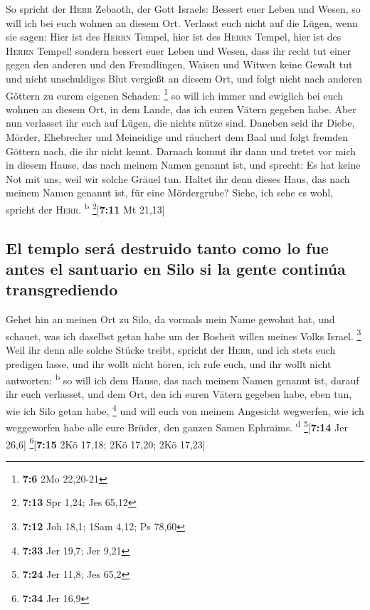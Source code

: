  So spricht der \textsc{Herr} Zebaoth, der Gott Israels:
Bessert euer Leben und Wesen, so will ich bei euch wohnen an diesem Ort.
 Verlasst euch nicht auf die Lügen, wenn sie sagen: Hier
ist des \textsc{Herrn} Tempel, hier ist des \textsc{Herrn} Tempel, hier
ist des \textsc{Herrn} Tempel!  sondern bessert euer Leben
und Wesen, dass ihr recht tut einer gegen den anderen  und
den Fremdlingen, Waisen und Witwen keine Gewalt tut und nicht
unschuldiges Blut vergießt an diesem Ort, und folgt nicht nach anderen
Göttern zu eurem eigenen Schaden: \footnote{\textbf{7:6} 2Mo 22,20-21}
 so will ich immer und ewiglich bei euch wohnen an diesem
Ort, in dem Lande, das ich euren Vätern gegeben habe. 
Aber nun verlasset ihr euch auf Lügen, die nichts nütze sind.
 Daneben seid ihr Diebe, Mörder, Ehebrecher und Meineidige
und räuchert dem Baal und folgt fremden Göttern nach, die ihr nicht
kennt.  Darnach kommt ihr dann und tretet vor mich in
diesem Hause, das nach meinem Namen genannt ist, und sprecht: Es hat
keine Not mit uns, weil wir solche Gräuel tun.  Haltet
ihr denn dieses Haus, das nach meinem Namen genannt ist, für eine
Mördergrube? Siehe, ich sehe es wohl, spricht der \textsc{Herr}.
\textsuperscript{b} \footnote{\textbf{7:13} Spr 1,24; Jes 65,12}{[}\textbf{7:11}
Mt 21,13{]}

\hypertarget{el-templo-seruxe1-destruido-tanto-como-lo-fue-antes-el-santuario-en-silo-si-la-gente-continuxfaa-transgrediendo}{%
\subsection{El templo será destruido tanto como lo fue antes el
santuario en Silo si la gente continúa
transgrediendo}\label{el-templo-seruxe1-destruido-tanto-como-lo-fue-antes-el-santuario-en-silo-si-la-gente-continuxfaa-transgrediendo}}

 Gehet hin an meinen Ort zu Silo, da vormals mein Name
gewohnt hat, und schauet, was ich daselbst getan habe um der Bosheit
willen meines Volks Israel. \footnote{\textbf{7:12} Joh 18,1; 1Sam 4,12;
  Ps 78,60}  Weil ihr denn alle solche Stücke treibt,
spricht der \textsc{Herr}, und ich stets euch predigen lasse, und ihr
wollt nicht hören, ich rufe euch, und ihr wollt nicht antworten:
\textsuperscript{b}  so will ich dem Hause, das nach
meinem Namen genannt ist, darauf ihr euch verlasset, und dem Ort, den
ich euren Vätern gegeben habe, eben tun, wie ich Silo getan habe,
\footnote{\textbf{7:33} Jer 19,7; Jer 9,21}  und will
euch von meinem Angesicht wegwerfen, wie ich weggeworfen habe alle eure
Brüder, den ganzen Samen Ephraims. \textsuperscript{d}
\footnote{\textbf{7:24} Jer 11,8; Jes 65,2}{[}\textbf{7:14} Jer 26,6{]}
\footnote{\textbf{7:34} Jer 16,9}{[}\textbf{7:15} 2Kö 17,18; 2Kö 17,20;
2Kö 17,23{]}


